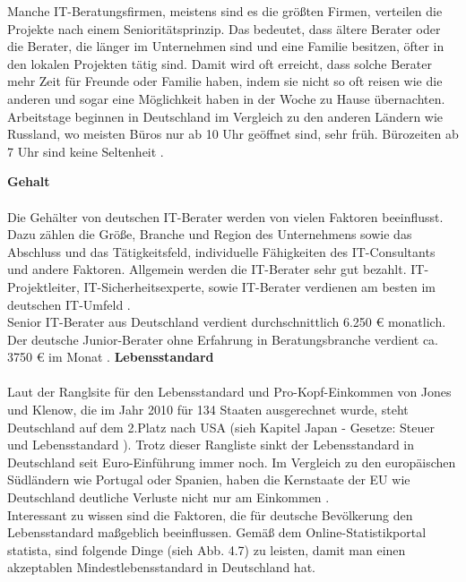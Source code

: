 	Manche IT-Beratungsfirmen, meistens sind es die größten Firmen, verteilen die Projekte nach einem Senioritätsprinzip. Das bedeutet, dass ältere Berater oder die Berater, die länger im Unternehmen sind und eine Familie besitzen, öfter in den lokalen Projekten tätig sind. Damit wird oft erreicht, dass solche Berater mehr Zeit für Freunde oder Familie haben, indem sie nicht so oft reisen wie die anderen und sogar eine Möglichkeit haben in der Woche zu Hause übernachten.\\
	Arbeitstage beginnen in Deutschland im Vergleich zu den anderen Ländern wie Russland, wo meisten Büros nur ab 10 Uhr geöffnet sind, sehr früh. Bürozeiten ab 7 Uhr sind keine Seltenheit \cite{ArbKulturDE}. %
	
	\textbf{Gehalt} \\ \\
	Die Gehälter von deutschen IT-Berater werden von vielen Faktoren beeinflusst. Dazu zählen die Größe, Branche und Region des Unternehmens sowie das Abschluss und das Tätigkeitsfeld, individuelle Fähigkeiten des IT-Consultants und andere Faktoren. Allgemein werden die IT-Berater sehr gut bezahlt. IT-Projektleiter, IT-Sicherheitsexperte, sowie IT-Berater verdienen am besten im deutschen IT-Umfeld \cite{VerdienstITinDE}.\\
	Senior IT-Berater aus Deutschland verdient durchschnittlich 6.250 € monatlich. Der deutsche Junior-Berater ohne Erfahrung in Beratungsbranche verdient ca. 3750 € im Monat .\cite{GehaltSAPBerDE}
	\newpage
	\textbf{Lebensstandard} \\ \\
	Laut der Ranglsite für den Lebensstandard und Pro-Kopf-Einkommen von Jones und Klenow, die im Jahr 2010 für 134 Staaten ausgerechnet wurde, steht Deutschland auf dem 2.Platz nach USA (sieh Kapitel Japan - Gesetze: Steuer und Lebensstandard \label{LebStdProKEink}). Trotz dieser Rangliste sinkt der Lebensstandard in Deutschland seit Euro-Einführung immer noch. Im Vergleich zu den europäischen Südländern wie Portugal oder Spanien, haben die Kernstaate der EU wie Deutschland deutliche Verluste nicht nur am Einkommen \cite{SteigungDELebstd}.\\
	Interessant zu wissen sind die Faktoren, die für deutsche Bevölkerung den Lebensstandard maßgeblich beeinflussen. Gemäß dem Online-Statistikportal statista, sind folgende Dinge (sieh Abb. 4.7) zu leisten, damit man einen akzeptablen Mindestlebensstandard in Deutschland hat.

